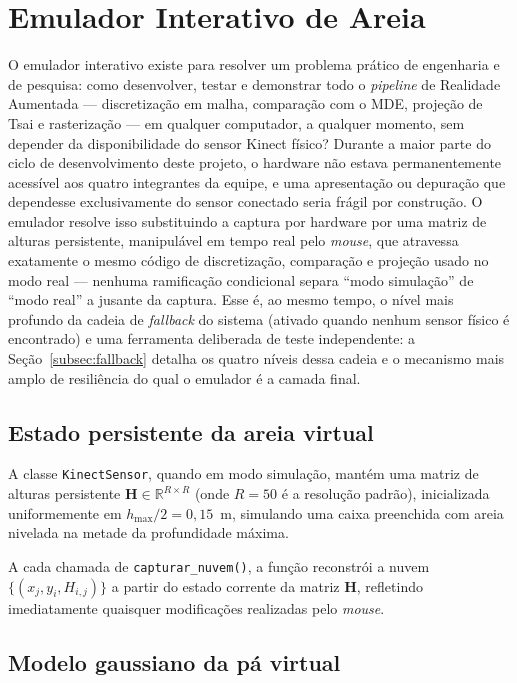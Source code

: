 \section{Emulador Interativo de Areia}
\label{sec:emulador}

O emulador interativo existe para resolver um problema prático de
engenharia e de pesquisa: como desenvolver, testar e demonstrar todo o
\textit{pipeline} de Realidade Aumentada — discretização em malha,
comparação com o MDE, projeção de Tsai e rasterização — em qualquer
computador, a qualquer momento, sem depender da disponibilidade
do sensor Kinect físico? Durante a maior parte do ciclo de
desenvolvimento deste projeto, o hardware não estava permanentemente
acessível aos quatro integrantes da equipe, e uma apresentação ou
depuração que dependesse exclusivamente do sensor conectado seria
frágil por construção. O emulador resolve isso substituindo a captura
por hardware por uma matriz de alturas persistente, manipulável em
tempo real pelo \emph{mouse}, que atravessa exatamente o mesmo código
de discretização, comparação e projeção usado no modo real — nenhuma
ramificação condicional separa ``modo simulação'' de ``modo real'' a
jusante da captura. Esse é, ao mesmo tempo, o nível mais profundo da
cadeia de \textit{fallback} do sistema (ativado quando nenhum
sensor físico é encontrado) e uma ferramenta deliberada de teste
independente: a Seção~\ref{subsec:fallback} detalha os quatro níveis
dessa cadeia e o mecanismo mais amplo de resiliência do qual o
emulador é a camada final.

\subsection{Estado persistente da areia virtual}

A classe \texttt{KinectSensor}, quando em modo simulação, mantém uma
matriz de alturas persistente $\mathbf{H} \in \mathbb{R}^{R \times R}$
(onde $R = 50$ é a resolução padrão), inicializada uniformemente em
$h_{\max} / 2 = 0{,}15$~m, simulando uma caixa preenchida com areia
nivelada na metade da profundidade máxima.

A cada chamada de \texttt{capturar\_nuvem()}, a função reconstrói a
nuvem $\{(x_j, y_i, H_{i,j})\}$ a partir do estado corrente da matriz
$\mathbf{H}$, refletindo imediatamente quaisquer modificações realizadas
pelo \emph{mouse}.

\subsection{Modelo gaussiano da pá virtual}

